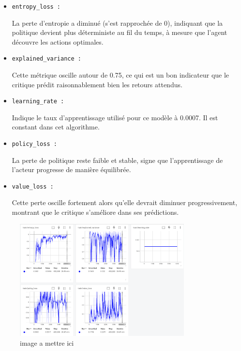 \documentclass{article}
\begin{document}
        \begin{itemize} 
            \item \begin{verbatim}entropy_loss :\end{verbatim}La perte d'entropie a diminué (s’est rapprochée de 0), indiquant que la politique devient plus déterministe au fil du temps, à mesure que l'agent découvre les actions optimales.
            \item \begin{verbatim}explained_variance :\end{verbatim}Cette métrique oscille autour de 0.75, ce qui est un bon indicateur que le critique prédit raisonnablement bien les retours attendus.
            \item \begin{verbatim}learning_rate :\end{verbatim}Indique le taux d’apprentissage utilisé pour ce modèle à 0.0007. Il est constant dans cet algorithme.
            \item \begin{verbatim}policy_loss :\end{verbatim}La perte de politique reste faible et stable, signe que l'apprentissage de l'acteur progresse de manière équilibrée.
            \item \begin{verbatim}value_loss :\end{verbatim}Cette perte oscille fortement alors qu’elle devrait diminuer progressivement, montrant que le critique s'améliore dans ses prédictions.
        \end{itemize}
        
        \begin{figure}[ht]
            \centering
            \includegraphics[width=0.8\textwidth]{8.png}
            \caption{image a mettre ici}
        \end{figure}
    
\end{document}
